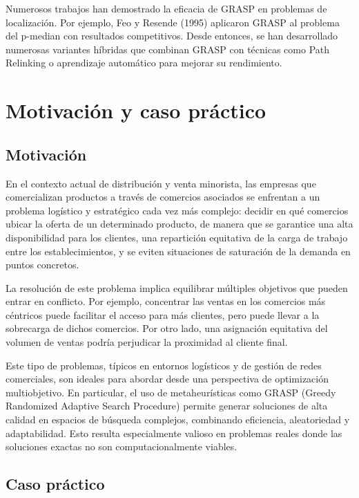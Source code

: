 \documentclass[12pt,a4paper]{book}
\begin{document}
Numerosos trabajos han demostrado la eficacia de GRASP en problemas de localización. 
Por ejemplo, Feo y Resende (1995) aplicaron GRASP al problema del p-median con resultados competitivos. 
Desde entonces, se han desarrollado numerosas variantes híbridas que combinan GRASP con técnicas como Path Relinking o aprendizaje automático para mejorar su rendimiento.


\section{Motivación y caso práctico}

\subsection{Motivación}

En el contexto actual de distribución y venta minorista, las empresas que comercializan productos a través de comercios asociados se enfrentan a un problema logístico y estratégico cada vez más complejo: decidir en qué comercios ubicar la oferta de un determinado producto, de manera que se garantice una alta disponibilidad para los clientes, una repartición equitativa de la carga de trabajo entre los establecimientos, y se eviten situaciones de saturación de la demanda en puntos concretos.

La resolución de este problema implica equilibrar múltiples objetivos que pueden entrar en conflicto. Por ejemplo, concentrar las ventas en los comercios más céntricos puede facilitar el acceso para más clientes, pero puede llevar a la sobrecarga de dichos comercios. Por otro lado, una asignación equitativa del volumen de ventas podría perjudicar la proximidad al cliente final.

Este tipo de problemas, típicos en entornos logísticos y de gestión de redes comerciales, son ideales para abordar desde una perspectiva de optimización multiobjetivo. En particular, el uso de metaheurísticas como GRASP (Greedy Randomized Adaptive Search Procedure) permite generar soluciones de alta calidad en espacios de búsqueda complejos, combinando eficiencia, aleatoriedad y adaptabilidad. Esto resulta especialmente valioso en problemas reales donde las soluciones exactas no son computacionalmente viables.

\subsection{Caso práctico}
\end{document}
